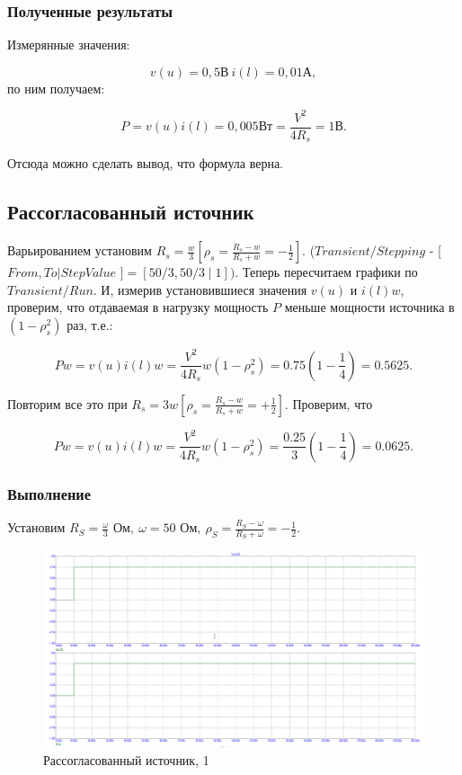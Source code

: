 \documentclass[a4paper, 14pt]{extarticle}%
\begin{document}
\newpage

\subsubsection{Полученные результаты}

Измерянные значения:

\[ v(u) = 0,5 \text{В}\  i(l) = 0,01 \text{А} ,\]
по ним получаем: 

\[ P=v(u)i(l)=0,005Вт= \frac{V^2}{4R_s} = 1В. \]

Отсюда можно сделать вывод, что формула верна.

\subsection{Рассогласованный источник}

Варьированием установим $R_{s}=\frac{w}{3}\left[\rho_{s}=\frac{R_{s}-w}{R_{s}+w}=-\frac{1}{2}\right]$. ($Transient/Stepping$ - [$From,To|StepValue$ $]=[50 / 3,50 / 3 \mid 1])$. Теперь пересчитаем графики по $Transient/Run$. И, измерив установившиеся значения $v(u)$ и $i(l) w$, проверим, что отдаваемая в нагрузку мощность $P$ меньше мощности источника в $\left(1-\rho_{s}^{2}\right)$ раз, т.е.:

\[
P w=v(u) i(l) w=\frac{V^{2}}{4 R_{s}} w\left(1-\rho_{s}^{2}\right)=0.75\left(1-\frac{1}{4}\right)=0.5625 .
\]

Повторим все это при $R_{s}=3 w\left[\rho_{s}=\frac{R_{s}-w}{R_{s}+w}=+\frac{1}{2}\right]$. Проверим, что

\[
P w=v(u) i(l) w=\frac{V^{2}}{4 R_{s}} w\left(1-\rho_{s}^{2}\right)=\frac{0.25}{3}\left(1-\frac{1}{4}\right)=0.0625 .
\]

\subsubsection{Выполнение}

Установим $R_{S}=\frac{\omega}{3} \text{ Ом} ,\ \omega=50 \text{ Ом},\ \rho_{S}=\frac{R_{S}-\omega}{R_{S}+\omega}=-\frac{1}{2}$. 


\begin{figure}[h!]
			\centering
			\includegraphics[width=1.1\linewidth]{./graphs/2.jpg}
			\caption{Рассогласованный источник, 1}
			\label{2.1}
\end{figure}
\end{document}
